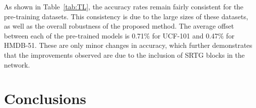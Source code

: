\documentclass[final,5p,times,twocolumn]{elsarticle}
\begin{document}
As shown in Table~\ref{tab:TL}, the accuracy rates remain fairly consistent for the pre-training datasets. This consistency is due to the large sizes of these datasets, as well as the overall robustness of the proposed method. The average offset between each of the pre-trained models is 0.71\% for UCF-101 and 0.47\% for HMDB-51. These are only minor changes in accuracy, which further demonstrates that the improvements observed are due to the inclusion of SRTG blocks in the network.

\begin{table}[ht]
\caption{Results on UCF-101 and HMDB-51 based on transfer learning.}
\centering
{}
\vspace{-1mm}
\label{tab:TL}
\end{table}



\section{Conclusions}
\label{sec:conclusions}
\end{document}
